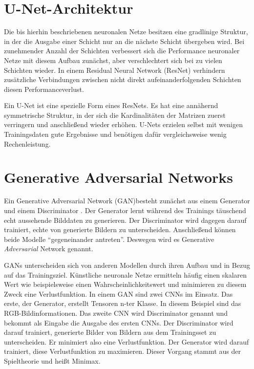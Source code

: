 \section{U-Net-Architektur}
\label{sec:unet}
Die bis hierhin beschriebenen neuronalen Netze besitzen eine gradlinige Struktur, in der die Ausgabe einer Schicht nur an die nächste Schicht übergeben wird. Bei zunehmender Anzahl der Schichten verbessert sich die Performance neuronaler Netze mit diesem Aufbau zunächst, aber verschlechtert sich bei zu vielen Schichten wieder. In einem Residual Neural Network (ResNet) verhindern zusätzliche Verbindungen zwischen nicht direkt aufeinanderfolgenden Schichten diesen Performanceverlust.

Ein U-Net ist eine spezielle Form eines ResNets. Es hat eine annähernd symmetrische Struktur, in der sich die Kardinalitäten der Matrizen zuerst verringern und anschließend wieder erhöhen. U-Nets erzielen selbst mit wenigen Trainingsdaten gute Ergebnisse und benötigen dafür vergleichsweise wenig Rechenleistung. \cite{he2015deep}

\section{Generative Adversarial Networks}
\label{gan}
Ein Generative Adversarial Network (GAN)besteht zunächst aus einem Generator und einem Discriminator \cite{goodfellow2014generative}. Der Generator lernt während des
Trainings täuschend echt aussehende Bilddaten zu generieren. Der Discriminator
wird dagegen darauf trainiert, echte von generierte Bildern zu unterscheiden.
Anschließend können beide Modelle ``gegeneinander antreten''. Deswegen wird es
Generative \textit{Adversarial} Network genannt.

GANs unterscheiden sich von anderen Modellen durch ihren Aufbau und in Bezug auf das Trainingsziel. Künstliche neuronale Netze ermitteln häufig einen skalaren Wert wie beispielsweise einen Wahrscheinlichkeitswert und minimieren zu diesem Zweck eine Verlustfunktion. In einem GAN sind zwei CNNs im Einsatz. Das erste, der Generator, erstellt Tensoren n-ter Klasse. In diesem Beispiel sind das RGB-Bildinformationen. Das zweite CNN wird Discriminator genannt und bekommt als Eingabe die Ausgabe des ersten CNNs. Der Discriminator wird darauf trainiert, generierte Bilder von Bildern aus dem Trainingsset zu unterscheiden. Er minimiert also eine Verlustfunktion. Der Generator wird darauf trainiert, diese Verlustfunktion zu maximieren. Dieser Vorgang stammt aus der Spieltheorie und heißt Minimax. \cite{goodfellow2014generative}

